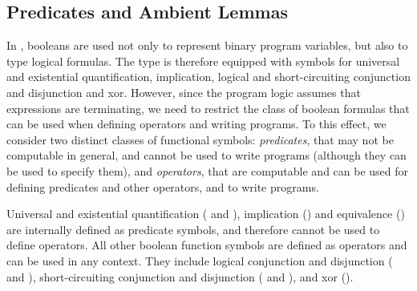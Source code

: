 \subsection{Predicates and Ambient Lemmas\label{sec:ec-specifics}}
In \EasyCrypt, booleans are used not only to represent binary program variables, but
also to type logical formulas. The  type is therefore equipped with
symbols for universal and existential quantification, implication, logical and
short-circuiting conjunction and disjunction and xor. However, since the program
logic assumes that expressions are terminating, we need to restrict the class of
boolean formulas that can be used when defining operators and writing programs.
To this effect, we consider two distinct classes of functional symbols:
\emph{predicates}, that may not be computable in general, and cannot be used to
write programs (although they can be used to specify them), and
\emph{operators}, that are computable and can be used for defining predicates
and other operators, and to write programs.

Universal and existential quantification ( and ),
implication (\rawec{=>}) and equivalence (\rawec{<=>}) are internally defined as
predicate symbols, and therefore cannot be used to define operators. All other
boolean function symbols are defined as operators and can be used in any
context. They include logical conjunction and disjunction (\rawec{/\\} and
\rawec{\\\/}), short-circuiting conjunction and disjunction (\rawec{\&\&} and
\rawec{\|\|}), and xor (\rawec{\^\^}).



